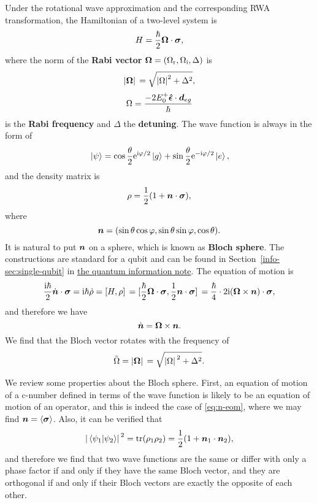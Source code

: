 \documentclass[hyperref, a4paper]{article}
\newcommand*{\ii}{\mathrm{i}}
\newcommand*{\ee}{\mathrm{e}}
\newcommand*{\concept}[1]{{\textbf{#1}}}
\newcommand{\infodoc}{\href{../information/quantum-circuit}{the quantum information note}}
\begin{document}
Under the rotational wave approximation and the corresponding RWA transformation, the Hamiltonian of a two-level system is 
\begin{equation}
    H = \frac{\hbar}{2} \vb*{\Omega} \cdot \vb*{\sigma},
    \label{eq:rwa-hamiltonian}
\end{equation}
where the norm of the \concept{Rabi vector} $\vb*{\Omega} = (\Omega_\text{r}, \Omega_\text{i} , \Delta)$ is
\begin{equation}
    \abs*{\vb*{\Omega}} = \sqrt{\abs{\Omega}^2 + \Delta^2},
\end{equation}
\begin{equation}
    \Omega = \frac{-2 E_0^+ \vu*{\epsilon} \cdot \vb*{d}_{eg}}{\hbar}
    \label{eq:rabi-freq}
\end{equation}
is the \concept{Rabi frequency} and $\Delta$ the \concept{detuning}.
The wave function is always in the form of 
\begin{equation}
    \ket*{\psi} = \cos \frac{\theta}{2} \ee^{\ii \varphi /2 } \ket*{g} + \sin \frac{\theta}{2} \ee^{- \ii \varphi / 2} \ket*{e}, 
\end{equation}
and the density matrix is 
\begin{equation}
    \rho = \frac{1}{2} (1 + \vb*{n} \cdot \vb*{\sigma}),
\end{equation}
where 
\begin{equation}
    \vb*{n} = (\sin \theta \cos \varphi, \sin \theta \sin \varphi, \cos \theta).
\end{equation}
It is natural to put $\vb*{n}$ on a sphere, which is known as \concept{Bloch sphere}.
The constructions are standard for a qubit and can be found in Section~\ref{info-sec:single-qubit} in \infodoc.
The equation of motion is 
\[
    \frac{\ii \hbar}{2} \dot{\vb*{n}} \cdot \vb*{\sigma} = \ii \hbar \dot{\rho} = \comm*{H}{\rho} = \comm*{\frac{\hbar}{2} \vb*{\Omega} \cdot \vb*{\sigma}}{\frac{1}{2} \vb*{n} \cdot \vb*{\sigma}} = \frac{\hbar}{4} \cdot 2 \ii (\vb*{\Omega} \times \vb*{n}) \cdot \vb*{\sigma},
\]
and therefore we have 
\begin{equation}
    \dot{\vb*{n}} = \vb*{\Omega} \times \vb*{n}. 
    \label{eq:n-eom}
\end{equation}
We find that the Bloch vector rotates with the frequency of 
\begin{equation}
    \tilde{\Omega} = \abs*{\vb*{\Omega}} = \sqrt{\abs*{\Omega}^2 + \Delta^2}.
\end{equation}

We review some properties about the Bloch sphere.
First, an equation of motion of a c-number defined in terms of the wave function is likely to be an equation of motion of an operator, and this is indeed the case of \eqref{eq:n-eom}, where we may find $\vb*{n} = \expval{\vb*{\sigma}}$.
Also, it can be verified that 
\begin{equation}
    \abs*{\braket*{\psi_1}{\psi_2}}^2 = \trace(\rho_1 \rho_2) = \frac{1}{2} (1 + \vb*{n}_1 \cdot \vb*{n}_2),
\end{equation}
and therefore we find that two wave functions are the same or differ with only a phase factor if and only if they have the same Bloch vector, and they are orthogonal if and only if their Bloch vectors are exactly the opposite of each other.
\end{document}
